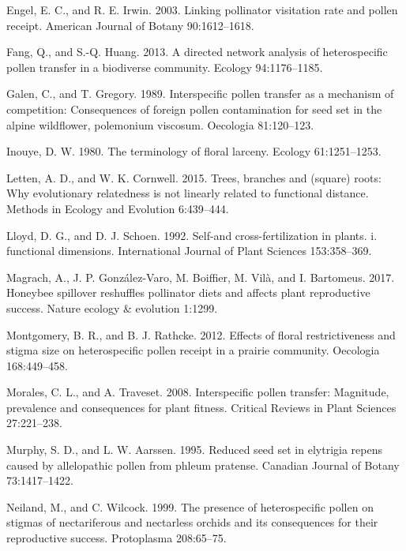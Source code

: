 \documentclass[11pt,a4paper]{article}
\begin{document}
\hypertarget{ref-engel2003}{}
Engel, E. C., and R. E. Irwin. 2003. Linking pollinator visitation rate
and pollen receipt. American Journal of Botany 90:1612--1618.

\hypertarget{ref-fang2013}{}
Fang, Q., and S.-Q. Huang. 2013. A directed network analysis of
heterospecific pollen transfer in a biodiverse community. Ecology
94:1176--1185.

\hypertarget{ref-galen1989}{}
Galen, C., and T. Gregory. 1989. Interspecific pollen transfer as a
mechanism of competition: Consequences of foreign pollen contamination
for seed set in the alpine wildflower, polemonium viscosum. Oecologia
81:120--123.

\hypertarget{ref-inouye1980}{}
Inouye, D. W. 1980. The terminology of floral larceny. Ecology
61:1251--1253.

\hypertarget{ref-letten2015}{}
Letten, A. D., and W. K. Cornwell. 2015. Trees, branches and (square)
roots: Why evolutionary relatedness is not linearly related to
functional distance. Methods in Ecology and Evolution 6:439--444.

\hypertarget{ref-lloyd1992}{}
Lloyd, D. G., and D. J. Schoen. 1992. Self-and cross-fertilization in
plants. i. functional dimensions. International Journal of Plant
Sciences 153:358--369.

\hypertarget{ref-magrach2017}{}
Magrach, A., J. P. González-Varo, M. Boiffier, M. Vilà, and I.
Bartomeus. 2017. Honeybee spillover reshuffles pollinator diets and
affects plant reproductive success. Nature ecology \& evolution 1:1299.

\hypertarget{ref-montgomery2012}{}
Montgomery, B. R., and B. J. Rathcke. 2012. Effects of floral
restrictiveness and stigma size on heterospecific pollen receipt in a
prairie community. Oecologia 168:449--458.

\hypertarget{ref-morales2008}{}
Morales, C. L., and A. Traveset. 2008. Interspecific pollen transfer:
Magnitude, prevalence and consequences for plant fitness. Critical
Reviews in Plant Sciences 27:221--238.

\hypertarget{ref-murphy1995}{}
Murphy, S. D., and L. W. Aarssen. 1995. Reduced seed set in elytrigia
repens caused by allelopathic pollen from phleum pratense. Canadian
Journal of Botany 73:1417--1422.

\hypertarget{ref-neiland1999}{}
Neiland, M., and C. Wilcock. 1999. The presence of heterospecific pollen
on stigmas of nectariferous and nectarless orchids and its consequences
for their reproductive success. Protoplasma 208:65--75.
\end{document}
